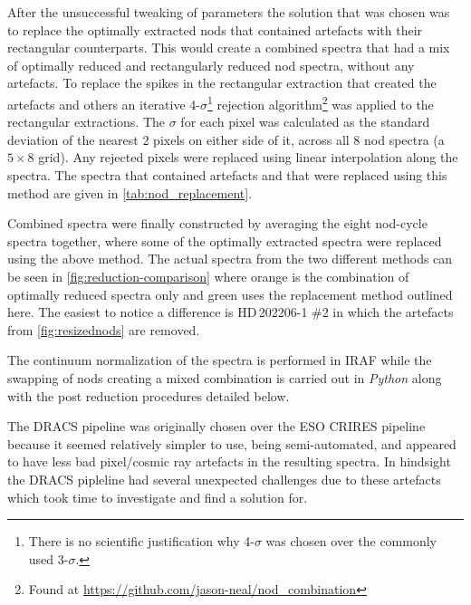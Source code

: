 After the unsuccessful tweaking of parameters the solution that was chosen was to replace the optimally extracted nods that contained artefacts with their rectangular counterparts.
This would create a combined spectra that had a mix of optimally reduced and rectangularly reduced nod spectra, without any artefacts.
To replace the spikes in the rectangular extraction that created the artefacts and others an iterative 4-\(\sigma\)\footnote{There is no scientific justification why 4-\(\sigma\) was chosen over the commonly used 3-\(\sigma\).} rejection algorithm\footnote{Found at \url{https://github.com/jason-neal/nod_combination}} was applied to the rectangular extractions.
The \(\sigma\) for each pixel was calculated as the standard deviation of the nearest 2 pixels on either side of it, across all 8 nod spectra (a $5\times8$ grid).
Any rejected pixels were replaced using linear interpolation along the spectra.
The spectra that contained artefacts and that were replaced using this method are given in \cref{tab:nod_replacement}.

Combined spectra were finally constructed by averaging the eight nod-cycle spectra together, where some of the optimally extracted spectra were replaced using the above method.
The actual spectra from the two different methods can be seen in \cref{fig:reduction-comparison} where orange is the combination of optimally reduced spectra only and green uses the replacement method outlined here.
The easiest to notice a difference is {HD\,202206-1 \#2} in which the artefacts from \cref{fig:resizednods} are removed.

The continuum normalization of the spectra is performed in {IRAF} while the swapping of nods creating a mixed combination is carried out in \emph{Python} along with the post reduction procedures detailed below.

The DRACS pipeline was originally chosen over the {ESO} {CRIRES} pipeline because it seemed relatively simpler to use, being semi-automated, and appeared to have less bad pixel/cosmic ray artefacts in the resulting spectra.
In hindsight the DRACS pipleline had several unexpected challenges due to these artefacts which took time to investigate and find a solution for.

